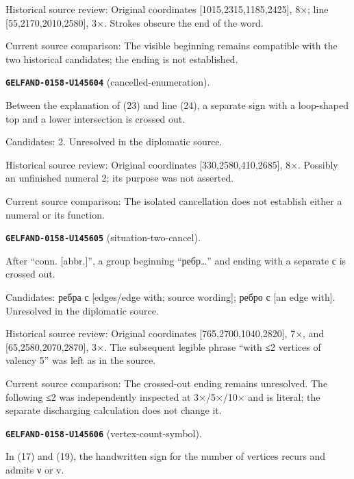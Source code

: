 Historical source review: Original coordinates [1015,2315,1185,2425], 8×; line [55,2170,2010,2580], 3×. Strokes obscure the end of the word.\par
Current source comparison: The visible beginning remains compatible with the two historical candidates; the ending is not established.\par\medskip
\par\noindent\leavevmode{}\label{GELFAND-0158-U145604}\label{GELFAND-P001456:cancelled-enumeration}\textbf{\texttt{GELFAND-0158-U145604}} (cancelled-enumeration).\nopagebreak[4]\par
Between the explanation of (23) and line (24), a separate sign with a loop-shaped top and a lower intersection is crossed out.\par
Candidates: 2. Unresolved in the diplomatic source.\par
Historical source review: Original coordinates [330,2580,410,2685], 8×. Possibly an unfinished numeral 2; its purpose was not asserted.\par
Current source comparison: The isolated cancellation does not establish either a numeral or its function.\par\medskip
\par\noindent\leavevmode{}\label{GELFAND-0158-U145605}\label{GELFAND-P001456:situation-two-cancel}\textbf{\texttt{GELFAND-0158-U145605}} (situation-two-cancel).\nopagebreak[4]\par
After “conn. [abbr.]”, a group beginning “ребр…” and ending with a separate с is crossed out.\par
Candidates: ребра с [edges/edge with; source wording]; ребро с [an edge with]. Unresolved in the diplomatic source.\par
Historical source review: Original coordinates [765,2700,1040,2820], 7×, and [65,2580,2070,2870], 3×. The subsequent legible phrase “with ≤2 vertices of valency 5” was left as in the source.\par
Current source comparison: The crossed-out ending remains unresolved. The following ≤2 was independently inspected at 3×/5×/10× and is literal; the separate discharging calculation does not change it.\par\medskip
\par\noindent\leavevmode{}\label{GELFAND-0158-U145606}\label{GELFAND-P001456:vertex-count-symbol}\textbf{\texttt{GELFAND-0158-U145606}} (vertex-count-symbol).\nopagebreak[4]\par
In (17) and (19), the handwritten sign for the number of vertices recurs and admits ν or v.\par
